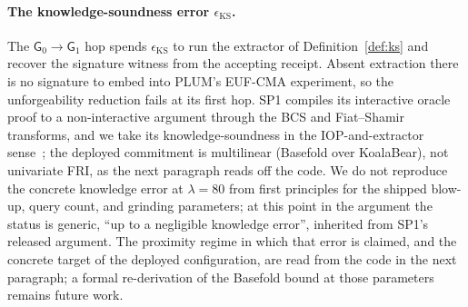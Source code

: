 \paragraph{The knowledge-soundness error $\epsilon_{\mathrm{KS}}$.}
The $\mathsf G_0\to\mathsf G_1$ hop spends $\epsilon_{\mathrm{KS}}$ to run the extractor of Definition~\ref{def:ks} and recover the signature witness from the accepting receipt. Absent extraction there is no signature to embed into PLUM's EUF-CMA experiment, so the unforgeability reduction fails at its first hop. SP1 compiles its interactive oracle proof to a non-interactive argument through the BCS and Fiat--Shamir transforms, and we take its knowledge-soundness in the IOP-and-extractor sense~\cite{bensasson2016iop}; the deployed commitment is multilinear (Basefold over KoalaBear), not univariate FRI, as the next paragraph reads off the code. We do not reproduce the concrete knowledge error at $\lambda=80$ from first principles for the shipped blow-up, query count, and grinding parameters; at this point in the argument the status is generic, ``up to a negligible knowledge error'', inherited from SP1's released argument. The proximity regime in which that error is claimed, and the concrete target of the deployed configuration, are read from the code in the next paragraph; a formal re-derivation of the Basefold bound at those parameters remains future work.

